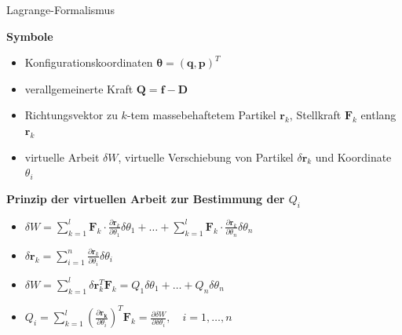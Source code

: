 \documentclass[
	ngerman,
	10pt,				%
	aspectratio=169 	%
]{beamer}
\begin{document}
\begin{frame}[t,fragile,label=Lagrange2_2]{\large Lagrange-Formalismus}
	
	\textbf{Symbole}
	\begin{itemize}
		\item Konfigurationskoordinaten $\boldsymbol{\theta} = (\mathbf{q}, \mathbf{p})^T$
		\item verallgemeinerte Kraft $\mathbf{Q} = \mathbf{f} - \mathbf{D}$
		\pause
		\item Richtungsvektor zu $k$-tem massebehaftetem Partikel $\mathbf{r}_k$, Stellkraft $\mathbf{F}_k$ entlang $\mathbf{r}_k$
		\pause
		\item virtuelle Arbeit $\delta W$, virtuelle Verschiebung von Partikel $\delta \mathbf{r}_k$ und Koordinate $\theta_{i}$
	\end{itemize}
	
	\pause
	\bigskip
	\textbf{Prinzip der virtuellen Arbeit zur Bestimmung der $Q_i$}
	\begin{itemize}
		\pause
		\item  $\delta W = \sum_{k=1}^l \mathbf{F}_k \cdot \frac{\partial \mathbf{r}_k}{\partial \theta_1} \delta \theta_1 +\ldots + \sum_{k=1}^l \mathbf{F}_k \cdot \frac{\partial \mathbf{r}_k}{\partial \theta_n} \delta \theta_n$
		\pause
		\item $\delta \mathbf{r}_{k} = \sum_{i = 1}^{n} \frac{\partial\mathbf{r}_{k}}{\partial\theta_i} \delta \theta_i$
		\pause
		\item $\delta W = \sum_{k=1}^{l}\delta \mathbf{r}_k^T \mathbf{F}_k = Q_1 \delta \theta_1 + \ldots + Q_n\delta \theta_n$
		\pause
		\item $Q_i = \sum_{k=1}^l \left(\frac {\partial \mathbf{r_k}} {\partial \theta_i} \right)^T \mathbf {F}_{k} = \frac{\partial\delta W}{\partial \delta \theta_i} ,\quad i=1,\ldots, n$
	\end{itemize}
	
\end{frame}

\end{document}
